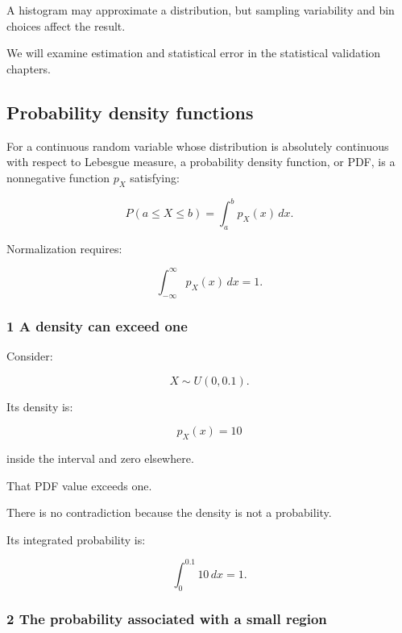 A histogram may approximate a distribution, but sampling variability and bin choices affect the result.

We will examine estimation and statistical error in the statistical validation chapters.

\subsection{Probability density functions}\label{02-foundations-ii-ch023-probability-density-functions}

\hypertarget{02-foundations-ii-ch023-probability-density-functions}{}

For a continuous random variable whose distribution is absolutely continuous with respect to Lebesgue measure, a probability density function, or PDF, is a nonnegative function \(p_X\) satisfying:

\[
 \boxed{ P(a\le X\le b) = \int_a^bp_X(x)\,dx }.
\]

Normalization requires:

\[
 \boxed{ \int_{-\infty}^{\infty}p_X(x)\,dx=1 }.
\]

\subsubsection{1 A density can exceed one}\label{02-foundations-ii-ch023-a-density-can-exceed-one}

\hypertarget{02-foundations-ii-ch023-a-density-can-exceed-one}{}

Consider:

\[
 X\sim U(0,0.1).
\]

Its density is:

\[
 p_X(x)=10
\]

inside the interval and zero elsewhere.

That PDF value exceeds one.

There is no contradiction because the density is not a probability.

Its integrated probability is:

\[
 \int_0^{0.1}10\,dx=1.
\]

\subsubsection{2 The probability associated with a small region}\label{02-foundations-ii-ch023-the-probability-associated-with-a-small-region}

\hypertarget{02-foundations-ii-ch023-the-probability-associated-with-a-small-region}{}

